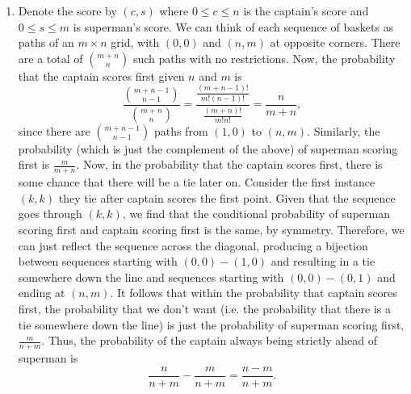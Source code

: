 \begin{enumerate}
    \item Denote the score by $(c, s)$ where $0 \leq c \leq n$ is the captain's score and $0 \leq s \leq m$ is superman's score. We can think of each sequence of baskets as paths of an $m \times n$ grid, with $(0, 0)$ and $(n, m)$ at opposite corners. There are a total of $\binom{m + n}{n}$ such paths with no restrictions. Now, the probability that the captain scores first given $n$ and $m$ is 
    \[
        \frac{\binom{m + n - 1}{n - 1}}{\binom{m + n}{n}} = \frac{\frac{(m + n - 1)!}{m!(n - 1)!}}{\frac{(m + n)!}{m!n!}} = \frac{n}{m + n},
    \]
    since there are $\binom{m + n - 1}{n - 1}$ paths from $(1, 0)$ to $(n, m)$. Similarly, the probability (which is just the complement of the above) of superman scoring first is $\frac{m}{m + n}$. Now, in the probability that the captain scores first, there is some chance that there will be a tie later on. Consider the first instance $(k, k)$ they tie after captain scores the first point. Given that the sequence goes through $(k, k)$, we find that the conditional probability of superman scoring first and captain scoring first is the same, by symmetry. Therefore, we can just reflect the sequence across the diagonal, producing a bijection between sequences starting with $(0, 0) - (1, 0)$ and resulting in a tie somewhere down the line and sequences starting with $(0, 0) - (0, 1)$ and ending at $(n, m)$. It follows that within the probability that captain scores first, the probability that we don't want (i.e. the probability that there is a tie somewhere down the line) is just the probability of superman scoring first, $\frac{m}{n + m}$. Thus, the probability of the captain always being strictly ahead of superman is
    \[
        \frac{n}{n + m} - \frac{m}{n + m} = \frac{n - m}{n + m}.
    \]
    
\end{enumerate}